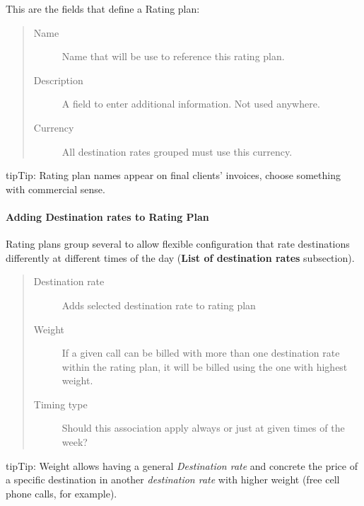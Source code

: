 \documentclass[letterpaper,10pt,english]{sphinxmanual}
\begin{document}
This are the fields that define a Rating plan:
\begin{quote}
\begin{description}
\item[{Name}] \leavevmode
Name that will be use to reference this rating plan.

\item[{Description}] \leavevmode
A field to enter additional information. Not used anywhere.

\item[{Currency}] \leavevmode
All destination rates grouped must use this currency.

\end{description}
\end{quote}

\begin{notice}{tip}{Tip:}
Rating plan names appear on final clients' invoices, choose something with commercial sense.
\end{notice}


\paragraph{Adding Destination rates to Rating Plan}
\label{administration_portal/brand/billing/rating_plans:adding-destination-rates-to-rating-plan}
Rating plans group several {\hyperref[administration_portal/brand/billing/destination_rates:destination\string-rates]{}} to allow flexible configuration that rate destinations differently
at different times of the day (\textbf{List of destination rates} subsection).
\begin{quote}
\begin{description}
\item[{Destination rate}] \leavevmode
Adds selected destination rate to rating plan

\item[{Weight}] \leavevmode
If a given call can be billed with more than one destination rate within the rating plan,
it will be billed using the one with highest weight.

\item[{Timing type}] \leavevmode
Should this association apply always or just at given times of the week?

\end{description}
\end{quote}

\begin{notice}{tip}{Tip:}
Weight allows having a general \emph{Destination rate} and concrete the price of
a specific destination in another \emph{destination rate} with higher weight (free cell
phone calls, for example).
\end{notice}
\end{document}
